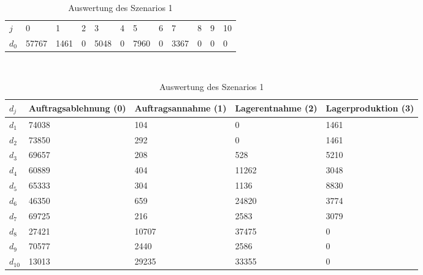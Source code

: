 \begin{table}[h!]
\renewcommand{\arraystretch}{1.5}
  \begin{center}
    \caption{Auswertung des Szenarios 1}  \label{AS1}
    \vspace*{3mm}
    \begin{tabular}{l l l l l l l l l l l l }  \hline 
         $j$ & 0 & 1  & 2 & 3 & 4  & 5 & 6 & 7 & 8 & 9 & 10  \\  
$d_{0}$ &  57767 &  1461 &  0 &  5048 &  0 &  7960 &  0 &  3367 &  0 &  0 &  0 \\
\hline
    \end{tabular} \\[3mm]
        \begin{tabular}{ l p{2.5cm} p{2.5cm} p{2.5cm} p{2.5cm} }   \hline    %
    $d_j$ & Auftrags\-ablehnung (0) & Auftrags\-annahme (1)  & Lager\-entnahme (2) & Lager\-produktion (3)\\\hline 
$d_{1}$  &  74038 &    104 &    0 &  1461 \\
$d_{2}$  &  73850 &    292 &    0 &  1461 \\
$d_{3}$  &  69657 &    208 &    528 &  5210 \\
$d_{4}$  &  60889 &    404 &  11262 &  3048 \\
$d_{5}$  &  65333 &    304 &   1136 &  8830 \\
$d_{6}$  &  46350 &    659 &  24820 &  3774 \\
$d_{7}$  &  69725 &    216 &   2583 &  3079 \\
$d_{8}$  &  27421 &  10707 &  37475 &   0 \\
$d_{9}$  &  70577 &   2440 &   2586 &   0 \\
$d_{10}$ &  13013 &  29235 &  33355 &   0 \\
          \hline
   \end{tabular} \\[3mm]
     \end{center}
\end{table}

